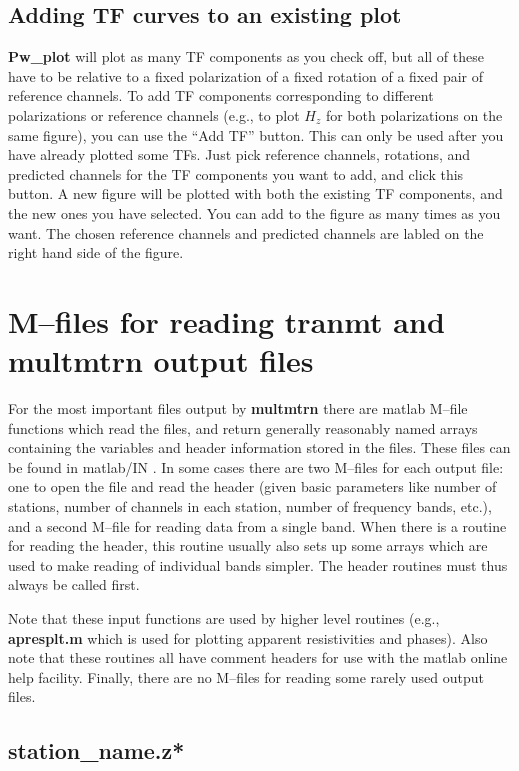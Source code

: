 \subsection{Adding TF curves to an existing plot}

{\bf Pw\_plot} will plot as many TF components as you check off,
but all of these have to be relative to a fixed polarization of
a fixed rotation of a fixed pair of reference channels.  To add
TF components corresponding to different polarizations or reference
channels (e.g., to plot $H_z$ for both polarizations on the same
figure), you can use the ``Add TF'' button.  This can only be
used after you have already plotted some TFs.  Just pick reference
channels, rotations, and predicted channels for the TF components you
want to add, and click this button.  A new figure will be plotted with
both the existing TF components, and the new ones you have selected.
You can add to the figure as many times as you want.  The chosen reference
channels and predicted channels are labled on the right hand side
of the figure.

\section{M--files for reading {\bf tranmt} and {\bf multmtrn} output files}

For the most important files output by {\bf multmtrn} there are
matlab M--file functions which read the files, and return generally
reasonably named arrays containing the variables and header information
stored in the files.  These files can be found in matlab/IN .  In some cases
there are two M--files for each output file: one to open the file and
read the header (given basic parameters like number of stations, number of
channels in each station, number of frequency bands, etc.), and a second
M--file for reading data from a single band.  When there is a routine
for reading the header, this routine usually also sets up some arrays which
are used to make reading of individual bands simpler.  The header routines
must thus always be called first.  

Note that these input functions are used
by higher level routines (e.g., {\bf apresplt.m} 
which is used for plotting apparent resistivities and phases).  
Also note that these routines
all have comment headers for use with the matlab online help facility.
Finally, there are no M--files for reading some rarely used output files.

\subsection{station\_name.z*}

